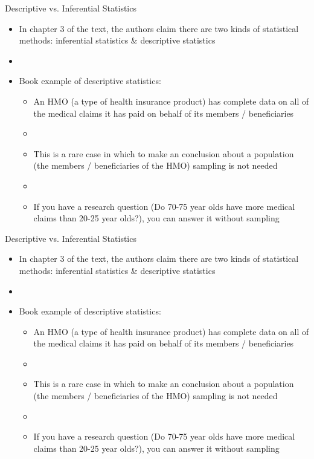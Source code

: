 \documentclass[xcolor=dvipsnames]{beamer}
\begin{document}
\begin{frame}{Descriptive vs. Inferential Statistics}
	\begin{itemize}
		\item In chapter 3 of the text, the authors claim there are two kinds of statistical methods: inferential statistics \& descriptive statistics
		\item[]
		\item Book example of descriptive statistics: 
		\begin{itemize}
			\item An HMO (a type of health insurance product) has complete data on all of the medical claims it has paid on behalf of its members / beneficiaries
			\item[]
			\item This is a rare case in which to make an conclusion about a population (the members / beneficiaries of the HMO) sampling is not needed
			\item[] 
			\item If you have a research question (Do 70-75 year olds have more medical claims than 20-25 year olds?), you can answer it without sampling
		\end{itemize}
	\end{itemize}
\end{frame}

\begin{frame}{Descriptive vs. Inferential Statistics}
\begin{itemize}
	\item In chapter 3 of the text, the authors claim there are two kinds of statistical methods: inferential statistics \& descriptive statistics
	\item[]
	\item Book example of descriptive statistics: 
	\begin{itemize}
		\item An HMO (a type of health insurance product) has complete data on all of the medical claims it has paid on behalf of its members / beneficiaries
		\item[]
		\item This is a rare case in which to make an conclusion about a population (the members / beneficiaries of the HMO) sampling is not needed
		\item[] 
		\item If you have a research question (Do 70-75 year olds have more medical claims than 20-25 year olds?), you can answer it without sampling
	\end{itemize}
\end{itemize}
\end{frame}
\end{document}
